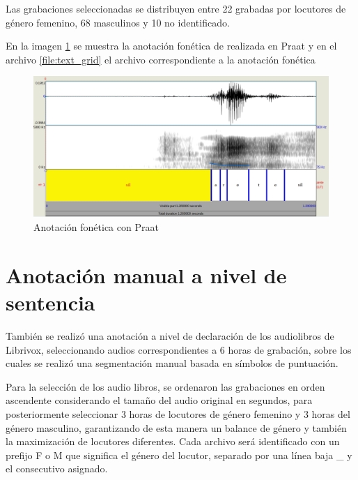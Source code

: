 \documentclass[a4paper,12pt,twoside]{report}
\begin{document}


Las grabaciones seleccionadas se distribuyen entre 22 grabadas por locutores de género femenino, 68 masculinos y 10 no identificado.

En la imagen \ref{img:anotacion_fonetica_praat} se muestra la anotación fonética de realizada en Praat y en el archivo \ref{file:text_grid} el archivo correspondiente a la anotación fonética



\begin{figure}[H]
\caption{Anotación fonética con Praat}
\label{img:anotacion_fonetica_praat}
\includegraphics[width=\textwidth]{imagenes/03_01_anotacion_fonetica.png}
\end{figure}





\section{Anotación manual a nivel de sentencia}

También se realizó una anotación a nivel de declaración de los audiolibros de Librivox, seleccionando audios correspondientes a 6 horas de grabación, sobre los cuales se realizó una segmentación manual basada en símbolos de puntuación.

Para la selección de los audio libros, se ordenaron las grabaciones en orden ascendente considerando el tamaño del audio original en segundos, para posteriormente seleccionar 3 horas de locutores de género femenino y 3 horas del género masculino, garantizando de esta manera un balance de género y también la maximización de locutores diferentes. Cada archivo será identificado con un prefijo F o M que significa el género del locutor, separado por una línea baja \_ y el consecutivo asignado.
\end{document}
